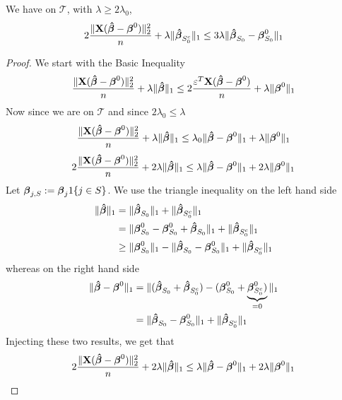 \begin{lemma}[Lemma 6.3.]
    \label{eqn: lemma 6.3.}
    We have on $\mathscr{T}$, with $\lambda \geq 2 \lambda_{0}$,
    \begin{equation*}
        2\frac{ \|\mathbf{X} (\boldsymbol{\hat{\beta}}-\boldsymbol{\beta}^{0} ) \|_{2}^{2}}{n} + \lambda \|\boldsymbol{\hat{\beta}}_{S_{0}^{c}} \|_{1} \leq 3 \lambda \|\boldsymbol{\hat{\beta}}_{S_{0}}-\boldsymbol{\beta}_{S_{0}}^{0} \|_{1}
    \end{equation*}
\end{lemma}
\begin{proof}
    We start with the Basic Inequality
    $$
        \frac{\| \mathbf{X} (\boldsymbol{\hat{\beta}}-\boldsymbol{\beta}^{0})\|_{2}^{2}}{n} + \lambda\|\boldsymbol{\hat{\beta}}\|_{1} \leq 2 \frac{\varepsilon^{T} \mathbf{X} (\boldsymbol{\hat{\beta}}-\boldsymbol{\beta}^{0})}{n}+\lambda\|\boldsymbol{\beta}^{0}\|_{1}
    $$
    Now since we are on $\mathscr{T}$ and since $2 \lambda_0 \leq \lambda$
    $$
        \frac{\| \mathbf{X} (\boldsymbol{\hat{\beta}}-\boldsymbol{\beta}^{0})\|_{2}^{2}}{n} + \lambda\|\boldsymbol{\hat{\beta}}\|_{1} \leq \lambda_0 \|\boldsymbol{\hat{\beta}}-\boldsymbol{\beta}^{0}\|_1 + \lambda\|\boldsymbol{\beta}^{0}\|_{1}
    $$
    $$
        2 \frac{\| \mathbf{X} (\boldsymbol{\hat{\beta}}-\boldsymbol{\beta}^{0})\|_{2}^{2}}{n}+2 \lambda\|\boldsymbol{\hat{\beta}}\|_{1} \leq \lambda \|\boldsymbol{\hat{\beta}}-\boldsymbol{\beta}^{0} \|_{1}+2 \lambda \|\boldsymbol{\beta}^{0} \|_{1}
    $$
    Let $\boldsymbol{\beta}_{j, S}:=\boldsymbol{\beta}_{j} 1\{j \in S\}$. We use the triangle inequality on the left hand side
    \begin{align*}
        \|\boldsymbol{\hat{\beta}}\|_{1}
         & = \|\boldsymbol{\hat{\beta}}_{S_{0}} \|_{1} + \|\boldsymbol{\hat{\beta}}_{S_{0}^{c}} \|_{1}                                                \\
         & = \|\boldsymbol{\beta}_{S_{0}}^{0} - \boldsymbol{\beta}_{S_{0}}^{0} + \boldsymbol{\hat{\beta}}_{S_{0}} \|_{1} + \|\boldsymbol{\hat{\beta}}_{S_{0}^{c}} \|_{1}          \\
         & \geq \|\boldsymbol{\beta}_{S_{0}}^{0} \|_{1} - \|\boldsymbol{\hat{\beta}}_{S_{0}}-\boldsymbol{\beta}_{S_{0}}^{0} \|_{1}+ \|\boldsymbol{\hat{\beta}}_{S_{0}^{c}} \|_{1}
    \end{align*}
    whereas on the right hand side
    \begin{align*}
        \|\boldsymbol{\hat{\beta}}-\boldsymbol{\beta}^{0} \|_{1}
         & =  \| (\boldsymbol{\hat{\beta}}_{S_{0}} + \boldsymbol{\hat{\beta}}_{S_{0}^{c}}) - (\boldsymbol{\beta}_{S_{0}}^{0} + \underbrace{\boldsymbol{\beta}_{S_{0}^{c}}^0)}_{=0} \|_{1} \\
         & =  \| \boldsymbol{\hat{\beta}}_{S_{0}}-\boldsymbol{\beta}_{S_{0}}^{0} \|_{1} + \|\boldsymbol{\hat{\beta}}_{S_{0}^{c}} \|_{1}
    \end{align*}
    Injecting these two results, we get that
    \begin{align*}
                 & 2 \frac{\| \X (\btahat-\bta^{0})\|_{2}^{2}}{n} + 2 \lambda\|\btahat\|_{1} \leq \lambda \|\btahat-\bta^{0} \|_{1}+2 \lambda \|\bta^{0} \|_{1}                                                                                                \\

\end{align*}
\end{proof}
